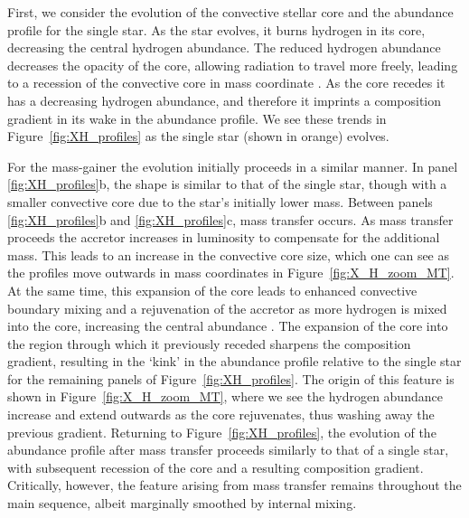 \documentclass[twocolumn, twocolappendix, oneside]{aastex631}
\begin{document}
First, we consider the evolution of the convective stellar core and the abundance profile for the single star. As the star evolves, it burns hydrogen in its core, decreasing the central hydrogen abundance. The reduced hydrogen abundance decreases the opacity of the core, allowing radiation to travel more freely, leading to a recession of the convective core in mass coordinate \citep{Mitalas+1972,Crowe+1982,Miglio+2008,SilvaAguirre+2011, Xin+2022}. As the core recedes it has a decreasing hydrogen abundance, and therefore it imprints a composition gradient in its wake in the abundance profile. We see these trends in Figure~\ref{fig:XH_profiles} as the single star (shown in orange) evolves.

For the mass-gainer the evolution initially proceeds in a similar manner. In panel \ref{fig:XH_profiles}b, the shape is similar to that of the single star, though with a smaller convective core due to the star's initially lower mass. Between panels \ref{fig:XH_profiles}b and \ref{fig:XH_profiles}c, mass transfer occurs. As mass transfer proceeds the accretor increases in luminosity to compensate for the additional mass. This leads to an increase in the convective core size, which one can see as the profiles move outwards in mass coordinates in Figure~\ref{fig:X_H_zoom_MT}. At the same time, this expansion of the core leads to enhanced convective boundary mixing and a rejuvenation of the accretor as more hydrogen is mixed into the core, increasing the central abundance \citep{Neo+1977}. The expansion of the core into the region through which it previously receded sharpens the composition gradient, resulting in the `kink' in the abundance profile relative to the single star for the remaining panels of Figure~\ref{fig:XH_profiles}. The origin of this feature is shown in Figure~\ref{fig:X_H_zoom_MT}, where we see the hydrogen abundance increase and extend outwards as the core rejuvenates, thus washing away the previous gradient. Returning to Figure~\ref{fig:XH_profiles}, the evolution of the abundance profile after mass transfer proceeds similarly to that of a single star, with subsequent recession of the core and a resulting composition gradient. Critically, however, the feature arising from mass transfer remains throughout the main sequence, albeit marginally smoothed by internal mixing.
\end{document}

